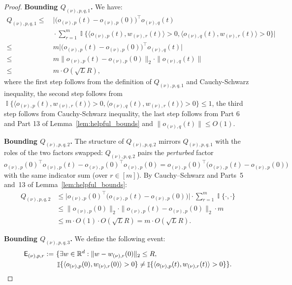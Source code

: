 \documentclass[11pt]{article}
\theoremstyle{plain}
\newcommand{\R}{\mathbb{R}}
\DeclareMathOperator{\I}{\mathbb{I}}
\begin{document}
\begin{proof}
    {\bf Bounding $Q_{(\nu), p, q, 1}$.} We have:
    \begin{align*}
        Q_{(\nu), p, q, 1} \leq & ~ \Big|\Big( o_{(\nu), p}(t) -  o_{(\nu), p}(0) \Big)^\top  o_{(\nu), q}(t) \\
        & ~ \cdot \sum_{r=1}^m \I\{\langle  o_{(\nu), p}(t), w_{(\nu), r}(t)\rangle > 0, \langle  o_{(\nu), q}(t), w_{(\nu), r}(t)\rangle > 0\} \Big| \\
        \leq & ~ m \Big|\Big( o_{(\nu), p}(t) -  o_{(\nu), p}(0) \Big)^\top  o_{(\nu), q}(t) \Big| \\
        \leq & ~ m \| o_{(\nu), p}(t) -  o_{(\nu), p}(0) \|_2 \cdot \|  o_{(\nu), q}(t) \| \\
        \leq & ~ m \cdot O(\sqrt{L}R ),
    \end{align*}
    where the first step follows from the definition of $Q_{(\nu), p, q, 1}$ and Cauchy-Schwarz inequality, the second step follows from $\I\{\langle  o_{(\nu), p}(t), w_{(\nu), r}(t)\rangle > 0, \langle  o_{(\nu), q}(t), w_{(\nu), r}(t)\rangle > 0\} \leq 1$, the third step follows from Cauchy-Schwarz inequality, the last step follows from Part 6 and Part 13 of Lemma~\ref{lem:helpful_bounds} and $\|  o_{(\nu), q}(t) \| \leq O(1)$.

    {\bf Bounding $Q_{(\nu), p, q, 2}$.} The structure of $Q_{(\nu),p,q,2}$ mirrors $Q_{(\nu),p,q,1}$ with the roles of the two factors swapped: $Q_{(\nu),p,q,2}$ pairs the {\it perturbed} factor $o_{(\nu),p}(0)^\top o_{(\nu),p}(t) - o_{(\nu),p}(0)^\top o_{(\nu),p}(0) = o_{(\nu),p}(0)^\top \big(o_{(\nu),p}(t) - o_{(\nu),p}(0)\big)$ with the same indicator sum (over $r\in[m]$). By Cauchy--Schwarz and Parts~5 and~13 of Lemma~\ref{lem:helpful_bounds}:
    \begin{align*}
        Q_{(\nu), p, q, 2} &\le \big|o_{(\nu),p}(0)^\top\big(o_{(\nu),p}(t) - o_{(\nu),p}(0)\big)\big|\cdot \sum_{r=1}^m \I\{\cdot,\cdot\} \\
        &\le \|o_{(\nu),p}(0)\|_2\cdot \|o_{(\nu),p}(t)-o_{(\nu),p}(0)\|_2\cdot m \\
        &\le m\cdot O(1)\cdot O(\sqrt{L}R) = m\cdot O(\sqrt L R).
    \end{align*}

    {\bf Bounding $Q_{(\nu), p, q, 3}$.} We define the following event:
    \begin{align*}
        {\sf E}_{(\nu), p, r} := & ~ \{ \exists w \in \R^d: \| w - w_{(\nu), r}(0) \|_2 \leq R,\\
        & ~ \I\{\langle  o_{(\nu), p}(0), w_{(\nu), r}(0) \rangle >0\} \ne \I\{\langle  o_{(\nu), p}(t), w_{(\nu), r}(t) \rangle >0\} \}.
    \end{align*}


\end{proof}
\end{document}
